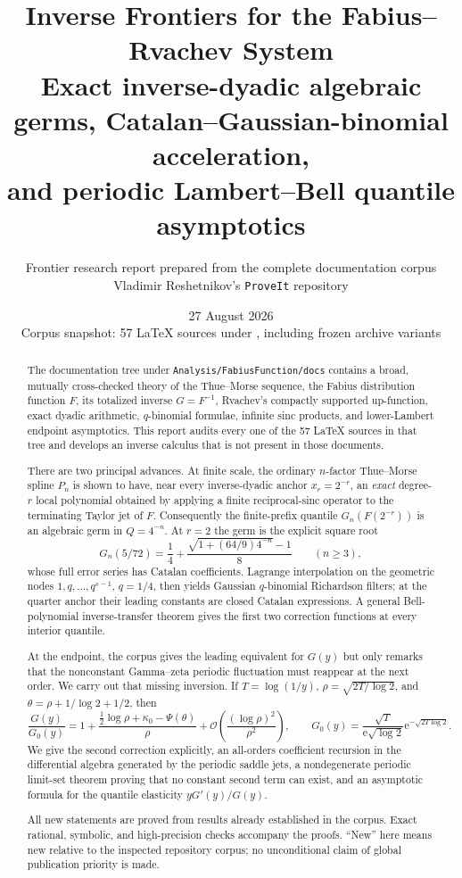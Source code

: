 \documentclass[11pt,oneside]{article}
\title{\bfseries Inverse Frontiers for the Fabius--Rvachev System\\[0.4em]
\large Exact inverse-dyadic algebraic germs, Catalan--Gaussian-binomial acceleration,\\
and periodic Lambert--Bell quantile asymptotics}
\author{Frontier research report prepared from the complete documentation corpus\\
\small Vladimir Reshetnikov's \texttt{ProveIt} repository}
\date{27 August 2026\\
\small Corpus snapshot: 57 LaTeX sources under \repo{}, including frozen archive variants}
\numberwithin{equation}{section}
\theoremstyle{definition}
\theoremstyle{remark}
\newcommand{\e}{\mathrm e}
\newcommand{\bigO}{\mathcal O}
\newcommand{\repo}{\nolinkurl{Analysis/FabiusFunction/docs}}
\begin{document}
\maketitle

\begin{abstract}
The documentation tree under \repo{} contains a broad, mutually cross-checked theory of the
Thue--Morse sequence, the Fabius distribution function $F$, its totalized inverse
$G=F^{-1}$, Rvachev's compactly supported up-function, exact dyadic arithmetic,
$q$-binomial formulae, infinite sinc products, and lower-Lambert endpoint asymptotics.
This report audits every one of the 57 LaTeX sources in that tree and develops an inverse
calculus that is not present in those documents.

There are two principal advances.  At finite scale, the ordinary $n$-factor Thue--Morse
spline $P_n$ is shown to have, near every inverse-dyadic anchor $x_r=2^{-r}$, an
\emph{exact} degree-$r$ local polynomial obtained by applying a finite reciprocal-sinc
operator to the terminating Taylor jet of $F$.  Consequently the finite-prefix quantile
$G_n(F(2^{-r}))$ is an algebraic germ in $Q=4^{-n}$.  At $r=2$ the germ is the explicit
square root
\[
 G_n(5/72)=\frac14+\frac{\sqrt{1+(64/9)4^{-n}}-1}{8}\qquad(n\ge3),
\]
whose full error series has Catalan coefficients.  Lagrange interpolation on the geometric
nodes $1,q,\ldots,q^{s-1}$, $q=1/4$, then yields Gaussian $q$-binomial Richardson filters;
at the quarter anchor their leading constants are closed Catalan expressions.  A general
Bell-polynomial inverse-transfer theorem gives the first two correction functions at every
interior quantile.

At the endpoint, the corpus gives the leading equivalent for $G(y)$ but only remarks that
the nonconstant Gamma--zeta periodic fluctuation must reappear at the next order.  We carry
out that missing inversion.  If $T=\log(1/y)$,
$\rho=\sqrt{2T/\log2}$, and $\theta=\rho+1/\log2+1/2$, then
\[
 \frac{G(y)}{G_0(y)}
 =1+\frac{\tfrac12\log\rho+\kappa_0-\Psi(\theta)}{\rho}
 +\bigO\!\left(\frac{(\log\rho)^2}{\rho^2}\right),
 \qquad
 G_0(y)=\frac{\sqrt T}{\e\sqrt{\log2}}\e^{-\sqrt{2T\log2}}.
\]
We give the second correction explicitly, an all-orders coefficient recursion in the
differential algebra generated by the periodic saddle jets, a nondegenerate periodic limit-set
theorem proving that no constant second term can exist, and an asymptotic formula for the
quantile elasticity $yG'(y)/G(y)$.

All new statements are proved from results already established in the corpus.  Exact rational,
symbolic, and high-precision checks accompany the proofs.  ``New'' here means new relative
to the inspected repository corpus; no unconditional claim of global publication priority is
made.
\end{abstract}
\end{document}
